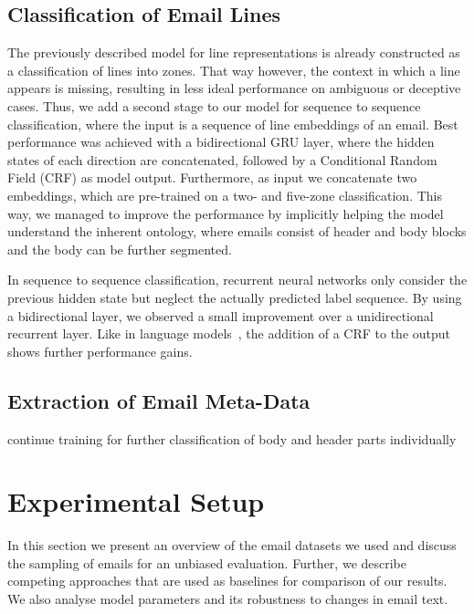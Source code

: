 \documentclass{llncs}
\begin{document}
\subsection{Classification of Email Lines}
The previously described model for line representations is already constructed as a classification of lines into zones.
That way however, the context in which a line appears is missing, resulting in less ideal performance on ambiguous or deceptive cases.
Thus, we add a second stage to our model for sequence to sequence classification, where the input is a sequence of line embeddings of an email.
Best performance was achieved with a bidirectional GRU layer, where the hidden states of each direction are concatenated, followed by a Conditional Random Field (CRF) as model output.
Furthermore, as input we concatenate two embeddings, which are pre-trained on a two- and five-zone classification.
This way, we managed to improve the performance by implicitly helping the model understand the inherent ontology, where emails consist of header and body blocks and the body can be further segmented.

In sequence to sequence classification, recurrent neural networks only consider the previous hidden state but neglect the actually predicted label sequence.
By using a bidirectional layer, we observed a small improvement over a unidirectional recurrent layer.
Like in language models~\cite{lstm_crf,lstm_cnn_crf}, the addition of a CRF to the output shows further performance gains.



\subsection{Extraction of Email Meta-Data}
continue training for further classification of body and header parts individually

\section{Experimental Setup}
In this section we present an overview of the email datasets we used and discuss the sampling of emails for an unbiased evaluation.
Further, we describe competing approaches that are used as baselines for comparison of our results.
We also analyse model parameters and its robustness to changes in email text.
\end{document}
